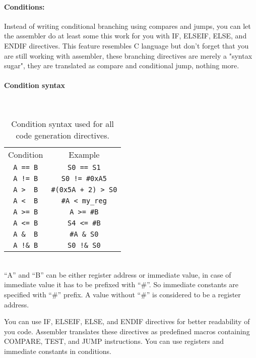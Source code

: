     \paragraph{Conditions:} Instead of writing conditional branching using compares and jumps, you can let the assembler do at least some this work for you with IF, ELSEIF, ELSE, and ENDIF directives. This feature resembles C language but don't forget that you are still working with assembler, these branching directives are merely a "syntax sugar", they are translated as compare and conditional jump, nothing more.

    \paragraph{Condition syntax}
        ~\\
        \begin{table}[h!]
            \mysmallfont{}
            \centering{}
            \begin{tabular}{|c|c|}
                \hline
                Condition & Example  \\
                \verb'A == B' & \verb'S0 == S1' \\
                \verb'A != B' & \verb'S0 != #0xA5' \\
                \verb'A >  B' & \verb'#(0x5A + 2) > S0' \\
                \verb'A <  B' & \verb'#A < my_reg' \\
                \verb'A >= B' & \verb'A >= #B' \\
                \verb'A <= B' & \verb'S4 <= #B' \\
                \verb'A &  B' & \verb'#A & S0' \\
                \verb'A !& B' & \verb'S0 !& S0' \\\hline
            \end{tabular}
            \caption{Condition syntax used for all code generation directives.}
        \end{table}

        ~\\``A'' and ``B'' can be either register address or immediate value, in case of immediate value it has to be prefixed with ``\#''. So immediate constants are specified with ``\#'' prefix. A value without ``\#'' is considered to be a register address.

        You can use IF, ELSEIF, ELSE, and ENDIF directives for better readability of you code. Assembler translates these directives as predefined macros containing COMPARE, TEST, and JUMP instructions. You can use registers and immediate constants in conditions.

